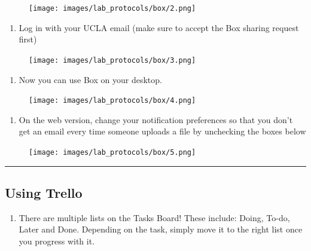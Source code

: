 \documentclass[
]{book}
\providecommand{\tightlist}{%
  \setlength{\itemsep}{0pt}\setlength{\parskip}{0pt}}
\begin{document}
\begin{figure}
\centering
\texttt{[image: images/lab\_protocols/box/2.png]}
\caption{}
\end{figure}

\begin{enumerate}
\def\labelenumi{\arabic{enumi}.}
\setcounter{enumi}{2}
\tightlist
\item
  Log in with your UCLA email (make sure to accept the Box sharing request first)
\end{enumerate}

\begin{figure}
\centering
\texttt{[image: images/lab\_protocols/box/3.png]}
\caption{}
\end{figure}

\begin{enumerate}
\def\labelenumi{\arabic{enumi}.}
\setcounter{enumi}{3}
\tightlist
\item
  Now you can use Box on your desktop.
\end{enumerate}

\begin{figure}
\centering
\texttt{[image: images/lab\_protocols/box/4.png]}
\caption{}
\end{figure}

\begin{enumerate}
\def\labelenumi{\arabic{enumi}.}
\setcounter{enumi}{4}
\tightlist
\item
  On the web version, change your notification preferences so that you don't get an email every time someone uploads a file by unchecking the boxes below
\end{enumerate}

\begin{figure}
\centering
\texttt{[image: images/lab\_protocols/box/5.png]}
\caption{}
\end{figure}

\begin{center}\rule{0.5\linewidth}{0.5pt}\end{center}

\hypertarget{using-trello}{%
\subsection{Using Trello}\label{using-trello}}

\begin{enumerate}
\def\labelenumi{\arabic{enumi}.}
\tightlist
\item
  There are multiple lists on the Tasks Board!
  These include: Doing, To-do, Later and Done.
  Depending on the task, simply move it to the right list once you progress with it.
\end{enumerate}
\end{document}
